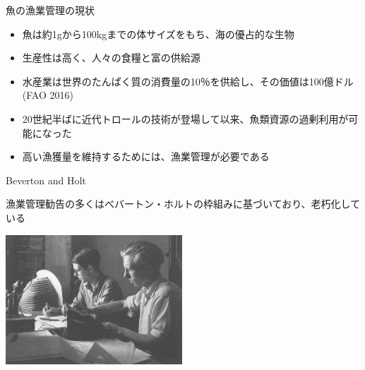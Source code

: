 \documentclass[
  ignorenonframetext,
]{beamer}
\providecommand{\tightlist}{%
  \setlength{\itemsep}{0pt}\setlength{\parskip}{0pt}}
\newcommand{\vspacelarge}{\vspace{6mm}}
\begin{document}
\begin{frame}{魚の漁業管理の現状}
\protect\hypertarget{ux9b5aux306eux6f01ux696dux7ba1ux7406ux306eux73feux72b6}{}

\begin{itemize}
\tightlist
\item
  魚は約1gから100kgまでの体サイズをもち、海の優占的な生物\\
  \vspacelarge
\item
  生産性は高く、人々の食糧と富の供給源\\
  \vspacelarge
\item
  水産業は世界のたんぱく質の消費量の10％を供給し、その価値は100億ドル
  (FAO 2016)\\
  \vspacelarge
\item
  20世紀半ばに近代トロールの技術が登場して以来、魚類資源の過剰利用が可能になった\\
  \vspacelarge
\item
  高い漁獲量を維持するためには、漁業管理が必要である
\end{itemize}

\end{frame}

\begin{frame}{Beverton and Holt}
\protect\hypertarget{beverton-and-holt}{}

漁業管理勧告の多くはべバートン・ホルトの枠組みに基づいており、老朽化している

\begin{center}\includegraphics[width=250px]{Fig1} \end{center}

\end{frame}
\end{document}
